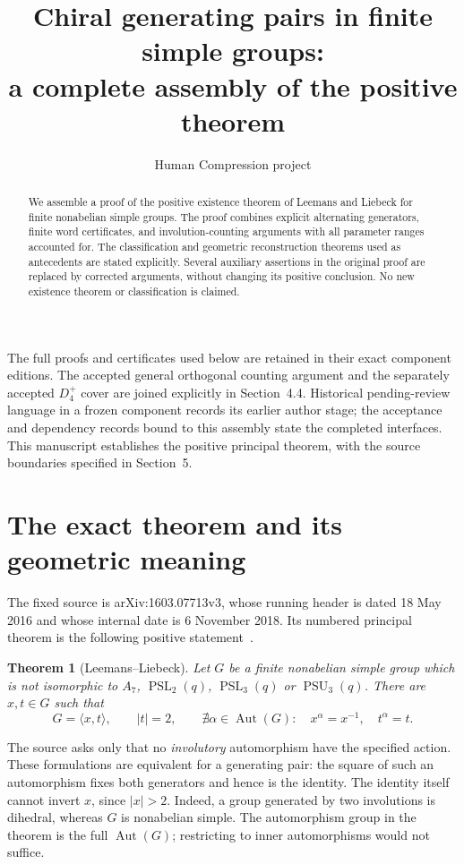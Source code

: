 \documentclass[11pt,a4paper]{article}
\title{Chiral generating pairs in finite simple groups:\\a complete assembly of the positive theorem}
\author{Human Compression project}\date{}
\newtheorem{theorem}{Theorem}\newtheorem{lemma}[theorem]{Lemma}\newtheorem{proposition}[theorem]{Proposition}\newtheorem{corollary}[theorem]{Corollary}
\newcommand{\Aut}{\operatorname{Aut}}\newcommand{\PSL}{\operatorname{PSL}}\newcommand{\PSU}{\operatorname{PSU}}\newcommand{\PSp}{\operatorname{PSp}}\newcommand{\Om}{\Omega}\newcommand{\Sp}{\operatorname{Sp}}
\begin{document}
\maketitle
\begin{abstract}
We assemble a proof of the positive existence theorem of Leemans and
Liebeck for finite nonabelian simple groups. The proof combines explicit
alternating generators, finite word certificates, and involution-counting
arguments with all parameter ranges accounted for. The classification
and geometric reconstruction theorems used as antecedents are stated
explicitly. Several auxiliary assertions in the original proof are replaced
by corrected arguments, without changing its positive conclusion. No new
existence theorem or classification is claimed.
\end{abstract}
The full proofs and certificates used below are retained in their exact
component editions. The accepted general orthogonal counting argument
and the separately accepted $D_4^+$ cover are joined explicitly in
Section~4.4. Historical pending-review language in a frozen component
records its earlier author stage; the acceptance and dependency records
bound to this assembly state the completed interfaces. This manuscript
establishes the positive principal theorem, with the source boundaries
specified in Section~5.

\section{The exact theorem and its geometric meaning}
The fixed source is arXiv:1603.07713v3, whose running header is dated
18 May 2016 and whose internal date is 6 November 2018. Its numbered
principal theorem is the following positive statement~\cite{LL}.
\begin{theorem}[Leemans--Liebeck]\label{main}
Let $G$ be a finite nonabelian simple group which is not isomorphic to
$A_7$, $\PSL_2(q)$, $\PSL_3(q)$ or $\PSU_3(q)$.
There are $x,t\in G$ such that
\[
 G=\langle x,t\rangle,\qquad |t|=2,
 \qquad\nexists\alpha\in\Aut(G):\quad
 x^\alpha=x^{-1},\quad t^\alpha=t.
\]
\end{theorem}
The source asks only that no \emph{involutory} automorphism have the
specified action. These formulations are equivalent for a generating
pair: the square of such an automorphism fixes both generators and hence
is the identity. The identity itself cannot invert $x$, since $|x|>2$.
Indeed, a group generated by two involutions is dihedral, whereas $G$ is
nonabelian simple. The automorphism group in the theorem is the full
$\Aut(G)$; restricting to inner automorphisms would not suffice.
\end{document}
